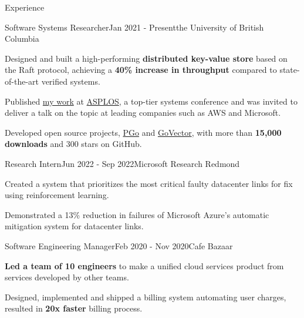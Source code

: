 \documentclass[
	10pt, %
]{resume} %
\begin{document}
\begin{rSection}{Experience}

  \begin{rSubsection}{Software Systems Researcher}{Jan 2021 -
    Present}{\textnormal{the} University of British Columbia}{}

    \item Designed and built a high-performing \textbf{distributed key-value store} based
      on the Raft protocol, achieving a \textbf{40\% increase in throughput} compared to 
      state-of-the-art verified systems.

    \item Published \href{https://dl.acm.org/doi/10.1145/3575693.3575695}{my work} 
      at \href{https://asplos-conference.org/}{ASPLOS}, a top-tier systems conference and was
      invited to deliver a talk on the topic at leading companies such as AWS and
      Microsoft.

    \item Developed open source projects, \href{https://github.com/DistCompiler/pgo}{PGo} 
      and \href{https://github.com/DistributedClocks/GoVector}{GoVector}, with
      more than \textbf{15,000 downloads} and 300 stars on GitHub.

	\end{rSubsection}

  \begin{rSubsection}{Research Intern}{Jun 2022 - Sep 2022}{Microsoft Research Redmond}{}

    \item Created a system that prioritizes the most critical faulty
      datacenter links for fix using reinforcement learning.

    \item Demonstrated a 13\% reduction in failures of Microsoft Azure's automatic
    mitigation system for datacenter links. 

	\end{rSubsection}

  \begin{rSubsection}{Software Engineering Manager}{Feb 2020 - Nov 2020}{Cafe Bazaar}{}

    \item \textbf{Led a team of 10 engineers} to make a uniﬁed cloud services product
      from services developed by other teams.

    \item Designed, implemented and shipped a billing system automating user
      charges, resulted in \textbf{20x faster} billing process.


\end{rSubsection}
\end{rSection}
\end{document}
